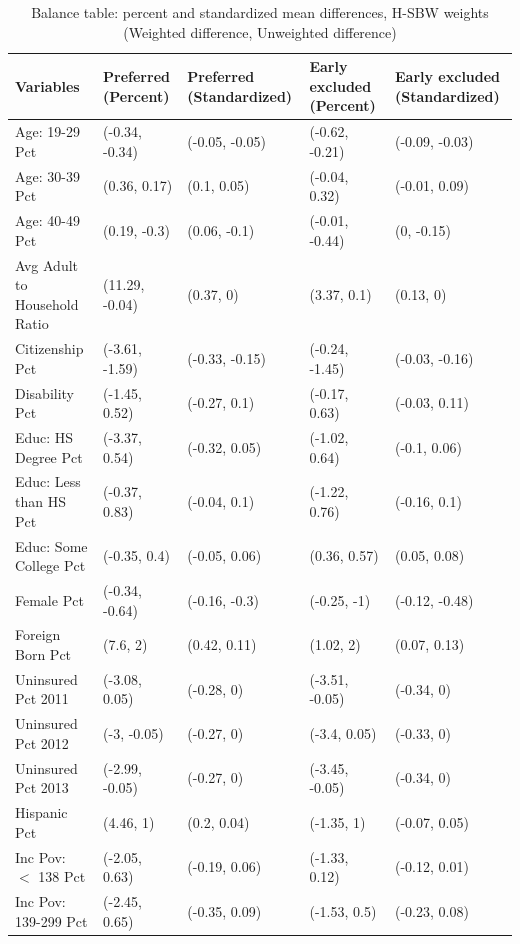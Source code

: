 \begin{landscape}
\begin{table}[h!]\caption{Balance table: percent and standardized mean differences, H-SBW weights \\ (Weighted difference, Unweighted difference)}\label{tab:baltab1}
\centering
\begin{threeparttable}\begin{tabular}{lllll}
  \hline
Variables & Preferred (Percent) & Preferred (Standardized) & Early excluded (Percent) & Early excluded (Standardized) \\ 
  \hline
Age: 19-29 Pct & (-0.34, -0.34) & (-0.05, -0.05) & (-0.62, -0.21) & (-0.09, -0.03) \\ 
  Age: 30-39 Pct & (0.36, 0.17) & (0.1, 0.05) & (-0.04, 0.32) & (-0.01, 0.09) \\ 
  Age: 40-49 Pct & (0.19, -0.3) & (0.06, -0.1) & (-0.01, -0.44) & (0, -0.15) \\ 
  Avg Adult to Household Ratio & (11.29, -0.04) & (0.37, 0) & (3.37, 0.1) & (0.13, 0) \\ 
  Citizenship Pct & (-3.61, -1.59) & (-0.33, -0.15) & (-0.24, -1.45) & (-0.03, -0.16) \\ 
  Disability Pct & (-1.45, 0.52) & (-0.27, 0.1) & (-0.17, 0.63) & (-0.03, 0.11) \\ 
  Educ: HS Degree Pct & (-3.37, 0.54) & (-0.32, 0.05) & (-1.02, 0.64) & (-0.1, 0.06) \\ 
  Educ: Less than HS Pct & (-0.37, 0.83) & (-0.04, 0.1) & (-1.22, 0.76) & (-0.16, 0.1) \\ 
  Educ: Some College Pct & (-0.35, 0.4) & (-0.05, 0.06) & (0.36, 0.57) & (0.05, 0.08) \\ 
  Female Pct & (-0.34, -0.64) & (-0.16, -0.3) & (-0.25, -1) & (-0.12, -0.48) \\ 
  Foreign Born Pct & (7.6, 2) & (0.42, 0.11) & (1.02, 2) & (0.07, 0.13) \\ 
  Uninsured Pct 2011 & (-3.08, 0.05) & (-0.28, 0) & (-3.51, -0.05) & (-0.34, 0) \\ 
  Uninsured Pct 2012 & (-3, -0.05) & (-0.27, 0) & (-3.4, 0.05) & (-0.33, 0) \\ 
  Uninsured Pct 2013 & (-2.99, -0.05) & (-0.27, 0) & (-3.45, -0.05) & (-0.34, 0) \\ 
  Hispanic Pct & (4.46, 1) & (0.2, 0.04) & (-1.35, 1) & (-0.07, 0.05) \\ 
  Inc Pov: $<$ 138 Pct & (-2.05, 0.63) & (-0.19, 0.06) & (-1.33, 0.12) & (-0.12, 0.01) \\ 
  Inc Pov: 139-299 Pct & (-2.45, 0.65) & (-0.35, 0.09) & (-1.53, 0.5) & (-0.23, 0.08) \\ 

\end{tabular}
\end{threeparttable}
\end{table}
\end{landscape}
